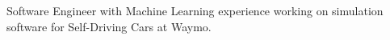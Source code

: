 
\begin{cvparagraph}
  Software Engineer with Machine Learning experience working on simulation
  software for Self-Driving Cars at Waymo.
\end{cvparagraph}
